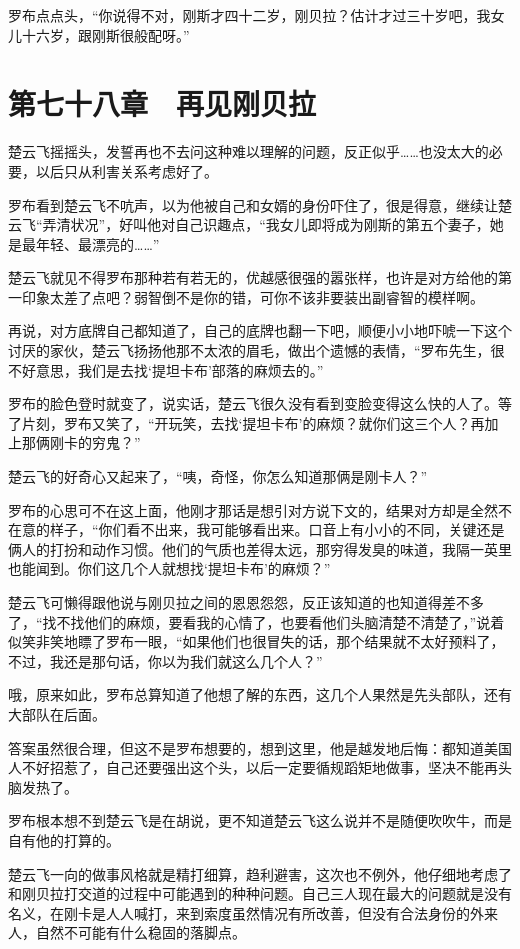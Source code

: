 罗布点点头，“你说得不对，刚斯才四十二岁，刚贝拉？估计才过三十岁吧，我女儿十六岁，跟刚斯很般配呀。”

\section{第七十八章　再见刚贝拉}

楚云飞摇摇头，发誓再也不去问这种难以理解的问题，反正似乎……也没太大的必要，以后只从利害关系考虑好了。

罗布看到楚云飞不吭声，以为他被自己和女婿的身份吓住了，很是得意，继续让楚云飞“弄清状况”，好叫他对自己识趣点，“我女儿即将成为刚斯的第五个妻子，她是最年轻、最漂亮的……”

楚云飞就见不得罗布那种若有若无的，优越感很强的嚣张样，也许是对方给他的第一印象太差了点吧？弱智倒不是你的错，可你不该非要装出副睿智的模样啊。

再说，对方底牌自己都知道了，自己的底牌也翻一下吧，顺便小小地吓唬一下这个讨厌的家伙，楚云飞扬扬他那不太浓的眉毛，做出个遗憾的表情，“罗布先生，很不好意思，我们是去找‘提坦卡布’部落的麻烦去的。”

罗布的脸色登时就变了，说实话，楚云飞很久没有看到变脸变得这么快的人了。等了片刻，罗布又笑了，“开玩笑，去找‘提坦卡布’的麻烦？就你们这三个人？再加上那俩刚卡的穷鬼？”

楚云飞的好奇心又起来了，“咦，奇怪，你怎么知道那俩是刚卡人？”

罗布的心思可不在这上面，他刚才那话是想引对方说下文的，结果对方却是全然不在意的样子，“你们看不出来，我可能够看出来。口音上有小小的不同，关键还是俩人的打扮和动作习惯。他们的气质也差得太远，那穷得发臭的味道，我隔一英里也能闻到。你们这几个人就想找‘提坦卡布’的麻烦？”

楚云飞可懒得跟他说与刚贝拉之间的恩恩怨怨，反正该知道的也知道得差不多了，“找不找他们的麻烦，要看我的心情了，也要看他们头脑清楚不清楚了，”说着似笑非笑地瞟了罗布一眼，“如果他们也很冒失的话，那个结果就不太好预料了，不过，我还是那句话，你以为我们就这么几个人？”

哦，原来如此，罗布总算知道了他想了解的东西，这几个人果然是先头部队，还有大部队在后面。

答案虽然很合理，但这不是罗布想要的，想到这里，他是越发地后悔：都知道美国人不好招惹了，自己还要强出这个头，以后一定要循规蹈矩地做事，坚决不能再头脑发热了。

罗布根本想不到楚云飞是在胡说，更不知道楚云飞这么说并不是随便吹吹牛，而是自有他的打算的。

楚云飞一向的做事风格就是精打细算，趋利避害，这次也不例外，他仔细地考虑了和刚贝拉打交道的过程中可能遇到的种种问题。自己三人现在最大的问题就是没有名义，在刚卡是人人喊打，来到索度虽然情况有所改善，但没有合法身份的外来人，自然不可能有什么稳固的落脚点。

